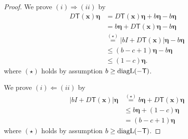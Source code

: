 \documentclass[journal,twoside,web]{ieeecolor}
\newcommand{\abs}[1]{{\left\vert #1 \right\vert}}
\newcommand{\norm}[1]{{\left\vert\kern-0.25ex\left\vert #1\right\vert\kern-0.25ex\right\vert}}
\newcommand{\xb}{\boldsymbol{x}}
\newcommand{\etab}{\boldsymbol{\eta}}
\newcommand{\Ts}{\mathsf{T}}
\newcommand{\Is}{\mathsf{Id}}
\begin{document}
\begin{proof}
%
We prove $(i)\Rightarrow (ii)$ by
%
\begingroup
$$
\begin{aligned}
        D\Ts(\xb)\etab  &= D\Ts(\xb)\etab +b\etab -  b\etab\\
        &= b\etab + D\Ts(\xb)\etab - b\etab \\
        & \overset{(\star)}{=} \abs{b I + D\Ts(\xb)}\etab - b\etab \\
        & \leq (b-c+1)\etab - b\etab \\
        & \leq (1-c)\etab.
\end{aligned}
$$
\endgroup
%
where $(\star)$ holds by assumption $b\geq \textnormal{diagL}(-\Ts)$.
%

We prove $(i)\Leftarrow (ii)$  by
%
$$
\begin{aligned}
\abs{bI + D\Ts(\xb)}\etab & \overset{(\star)}{=}  b\etab + D\Ts(\xb)\etab\\
& \leq b\etab + (1-c)\etab\\
%
& = (b-c+1)\etab
\end{aligned}
$$
where $(\star)$ holds by assumption $b\geq \textnormal{diagL}(-\Ts)$.

\end{proof}
\end{document}
